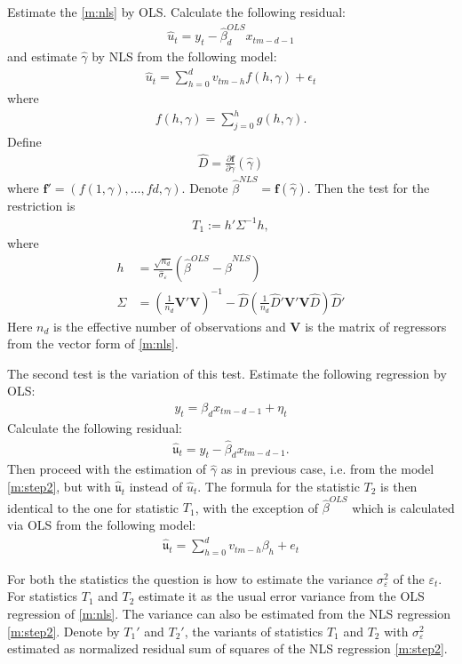 \documentclass{article}
\begin{document}
Estimate the \eqref{m:nls} by OLS. Calculate the following residual:
\begin{align*}
    \hat{u}_t=y_t-\hat\beta_d^{OLS}x_{tm-d-1}
\end{align*}
and estimate $\hat\gamma$ by NLS from the following model:
\begin{align}\label{m:step2}
    \hat{u}_t=\sum_{h=0}^{d}v_{tm-h}f(h,\gamma)+\epsilon_t
\end{align}
where 
\begin{align*}
    f(h,\gamma)=\sum_{j=0}^hg(h,\gamma).
\end{align*}
Define 
\begin{align*}
    \hat{D}=\frac{\partial \bm{f}}{\partial \gamma}(\hat\gamma)
\end{align*}
where $\bm{f}'=(f(1,\gamma),\dots,f{d,\gamma})$. Denote $\hat\beta^{NLS}=\bm{f}(\hat\gamma)$. Then the test for the restriction is
\begin{align*}
    T_1:=h'\Sigma^{-1}h,
\end{align*}
where
\begin{align*}
    h&=\frac{\sqrt{n_d}}{\hat\sigma_\varepsilon}(\hat\beta^{OLS}-\hat\beta^{NLS})\\
    \Sigma&=\left(\frac{1}{n_d}\bm{V}'\bm{V}\right)^{-1}-\hat{D}\left(\frac{1}{n_d}\hat{D}'\bm{V}'\bm{V}\hat{D}\right)\hat{D}'
\end{align*}
Here $n_d$ is the effective number of observations and $\bm{V}$ is the matrix of regressors from the vector form of \eqref{m:nls}.

The second test is the variation of this test. Estimate the following regression by OLS:
\begin{align*}
    y_t=\beta_{d}x_{tm-d-1}+\eta_t
\end{align*}
Calculate the following residual:
\begin{align*}
    \hat{\mathfrak{u}}_{t}=y_t-\hat\beta_dx_{tm-d-1}.
\end{align*}
Then proceed with the estimation of $\hat\gamma$ as in previous case, i.e. from the model \eqref{m:step2}, but with $\hat{\mathfrak{u}}_t$ instead of $\hat{u}_t$. The formula for the statistic $T_2$ is then identical to the one for statistic $T_1$, with the exception of $\hat\beta^{OLS}$ which is calculated via OLS from the following model:
\begin{align*}
    \hat{\mathfrak{u}}_{t}=\sum_{h=0}^dv_{tm-h}\beta_h+e_t
\end{align*}

For both the statistics the question is how to estimate the variance $\sigma_\varepsilon^2$ of the $\varepsilon_t$. For statistics $T_1$ and $T_2$ estimate it as the usual error variance from the OLS regression of \eqref{m:nls}. The variance can also be estimated from the NLS regression \eqref{m:step2}. Denote by $T_1'$ and $T_2'$, the variants of statistics $T_1$ and $T_2$ with $\sigma_{\varepsilon}^2$ estimated as normalized residual sum of squares of the NLS regression \eqref{m:step2}.
\end{document}
